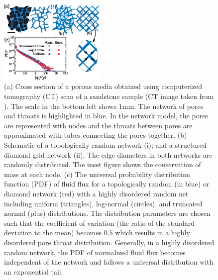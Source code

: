 \documentclass[%
 reprint,
 amsmath,amssymb,
 aps,
]{revtex4-1}
\newcommand{\AZ}[1]{\noindent \color{purple} (AZ: #1)\normalcolor}
\begin{document}
\begin{figure}[h]
    \includegraphics[width = 0.45\textwidth]{Figs/Fig1_pppp.eps}
    \caption{(a) Cross section of a porous media obtained using  computerized tomography (CT) scan of a sandstone sample (CT image taken from \cite{akanji2010finite}). The scale in the bottom left shows $1$mm. The network of pores and throats is highlighted in blue. In the network model, the pores are represented with nodes and the throats between pores are approximated with tubes connecting the pores together. (b) Schematic of a topologically random network (i); and a structured diamond grid network (ii). The edge diameters in both networks are randomly distributed. The inset figure shows the conservation of mass at each node. (c) The universal probability distribution function (PDF) of fluid flux for a topologically random (in blue) or diamond network (red) with a highly disordered random net including uniform (triangles), log-normal (circles), and truncated normal (plus) distributions. The distribution parameters are chosen such that the coefficient of variation (the ratio of the standard deviation to the mean) becomes $0.5$ which results in a highly disordered pore throat distribution. Generally, in a highly disordered random network, the PDF of normalized fluid flux becomes independent of the network and follows a universal distribution with an exponential tail. }\label{fig:fig1}
\end{figure}
%
\end{document}

